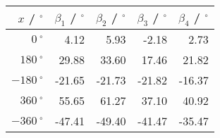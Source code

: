 \begin{tabular}{rrrrr}\\
 $x$ / ${}^\circ$ & $\beta_1$ / ${}^\circ$ & $\beta_2$ / ${}^\circ$ & $\beta_3$ / ${}^\circ$ & $\beta_4$ / ${}^\circ$  \\
 \hline
$0~^\circ$ & 4.12 & 5.93 & -2.18 & 2.73\\
$180~^\circ$ & 29.88 & 33.60 & 17.46 & 21.82\\
$-180~^\circ$ & -21.65 & -21.73 & -21.82 & -16.37\\
$360~^\circ$ & 55.65 & 61.27 & 37.10 & 40.92\\
$-360~^\circ$ & -47.41 & -49.40 & -41.47 & -35.47
\end{tabular}